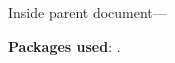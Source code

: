 \documentclass{article}\usepackage[]{graphicx}\usepackage[]{color}
\begin{document}
Inside parent document---

\textbf{Packages used}: .
\end{document}
